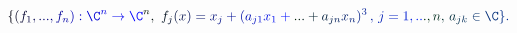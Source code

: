 \documentclass[12pt]{article}
\begin{document}
\makeatletter
\renewcommand*{\@textcolor}[3]{%
  \protect\leavevmode
  \begingroup
    \color#1{#2}#3%
  \endgroup
}
\makeatother
\begin{displaymath}
\mathcolor[RGB]{0,0,15}{\{} \mathcolor[RGB]{0,0,30}{(} \mathcolor[RGB]{0,0,45}{f} _ { \mathcolor[RGB]{0,0,60}{1} } \mathcolor[RGB]{0,0,75}{,} \mathcolor[RGB]{0,0,90}{.} \mathcolor[RGB]{0,0,105}{.} \mathcolor[RGB]{0,0,120}{.} \mathcolor[RGB]{0,0,135}{,} \mathcolor[RGB]{0,0,150}{f} _ { \mathcolor[RGB]{0,0,165}{n} } \mathcolor[RGB]{0,0,180}{)} \mathcolor[RGB]{0,0,195}{:} \mathcolor[RGB]{0,0,210}{\C} ^ { \mathcolor[RGB]{0,0,225}{n} } \mathcolor[RGB]{0,0,240}{\to} \mathcolor[RGB]{0,0,255}{\C} ^ { \mathcolor[RGB]{0,15,0}{n} } \mathcolor[RGB]{0,15,15}{,} \ \mathcolor[RGB]{0,15,30}{f} _ { \mathcolor[RGB]{0,15,45}{j} } \mathcolor[RGB]{0,15,60}{(} \mathcolor[RGB]{0,15,75}{x} \mathcolor[RGB]{0,15,90}{)} \mathcolor[RGB]{0,15,105}{=} \mathcolor[RGB]{0,15,120}{x} _ { \mathcolor[RGB]{0,15,135}{j} } \mathcolor[RGB]{0,15,150}{+} \mathcolor[RGB]{0,15,165}{(} \mathcolor[RGB]{0,15,180}{a} _ { \mathcolor[RGB]{0,15,195}{j} \mathcolor[RGB]{0,15,210}{1} } \mathcolor[RGB]{0,15,225}{x} _ { \mathcolor[RGB]{0,15,240}{1} } \mathcolor[RGB]{0,15,255}{+} \mathcolor[RGB]{0,30,0}{.} \mathcolor[RGB]{0,30,15}{.} \mathcolor[RGB]{0,30,30}{.} \mathcolor[RGB]{0,30,45}{+} \mathcolor[RGB]{0,30,60}{a} _ { \mathcolor[RGB]{0,30,75}{j} \mathcolor[RGB]{0,30,90}{n} } \mathcolor[RGB]{0,30,105}{x} _ { \mathcolor[RGB]{0,30,120}{n} } \mathcolor[RGB]{0,30,135}{)} ^ { \mathcolor[RGB]{0,30,150}{3} } \, \mathcolor[RGB]{0,30,165}{,} \, \mathcolor[RGB]{0,30,180}{j} \mathcolor[RGB]{0,30,195}{=} \mathcolor[RGB]{0,30,210}{1} \mathcolor[RGB]{0,30,225}{,} \mathcolor[RGB]{0,30,240}{.} \mathcolor[RGB]{0,30,255}{.} \mathcolor[RGB]{0,45,0}{.} \mathcolor[RGB]{0,45,15}{,} \mathcolor[RGB]{0,45,30}{n} \mathcolor[RGB]{0,45,45}{,} \, \mathcolor[RGB]{0,45,60}{a} _ { \mathcolor[RGB]{0,45,75}{j} \mathcolor[RGB]{0,45,90}{k} } \mathcolor[RGB]{0,45,105}{\in} \mathcolor[RGB]{0,45,120}{\C} \mathcolor[RGB]{0,45,135}{\}} \mathcolor[RGB]{0,45,150}{.}
\end{displaymath}
\end{document}
